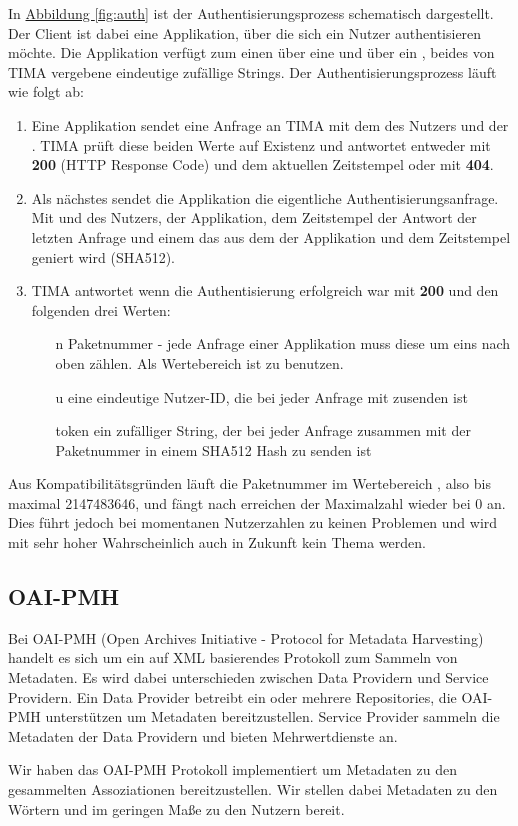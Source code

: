 In \hyperref[fig:auth]{Abbildung \ref*{fig:auth}} ist der Authentisierungsprozess schematisch dargestellt. Der Client ist dabei eine Applikation, über die sich ein Nutzer authentisieren möchte. Die Applikation verfügt zum einen über eine  und über ein , beides von TIMA vergebene eindeutige zufällige Strings. Der Authentisierungsprozess läuft wie folgt ab:
\begin{enumerate}
	\item Eine Applikation sendet eine Anfrage an TIMA mit dem  des Nutzers und der . TIMA prüft diese beiden Werte auf Existenz und antwortet entweder mit \textbf{200} (HTTP Response Code) und dem aktuellen Zeitstempel oder mit \textbf{404}.
	\item Als nächstes sendet die Applikation die eigentliche Authentisierungsanfrage. Mit  und  des Nutzers,  der Applikation, dem Zeitstempel der Antwort der letzten Anfrage und einem  das aus dem  der Applikation und dem Zeitstempel geniert wird (SHA512).
	\item TIMA antwortet wenn die Authentisierung erfolgreich war mit \textbf{200} und den folgenden drei Werten:
	\begin{itemize}
		\item[n] Paketnummer - jede Anfrage einer Applikation muss diese um eins nach oben zählen. Als Wertebereich ist  zu benutzen.
		\item[u] eine eindeutige Nutzer-ID, die bei jeder Anfrage mit zusenden ist
		\item[token] ein zufälliger String, der bei jeder Anfrage zusammen mit der Paketnummer  in einem SHA512 Hash zu senden ist
	\end{itemize}
\end{enumerate}

Aus Kompatibilitätsgründen läuft die Paketnummer im Wertebereich , also bis maximal 2147483646, und fängt nach erreichen der Maximalzahl wieder bei 0 an. Dies führt jedoch bei momentanen Nutzerzahlen zu keinen Problemen und wird mit sehr hoher Wahrscheinlich auch in Zukunft kein Thema werden.

\subsection{OAI-PMH}\label{sec:oai-pmh} %
Bei OAI-PMH (Open Archives Initiative - Protocol for Metadata Harvesting) handelt es sich um ein auf XML basierendes Protokoll zum Sammeln von Metadaten. Es wird dabei unterschieden zwischen Data Providern und Service Providern. Ein Data Provider betreibt ein oder mehrere Repositories, die OAI-PMH unterstützen um Metadaten bereitzustellen. Service Provider sammeln die Metadaten der Data Providern und bieten Mehrwertdienste an.

Wir haben das OAI-PMH Protokoll implementiert um Metadaten zu den gesammelten Assoziationen bereitzustellen. Wir stellen dabei Metadaten zu den Wörtern und im geringen Maße zu den Nutzern bereit.
